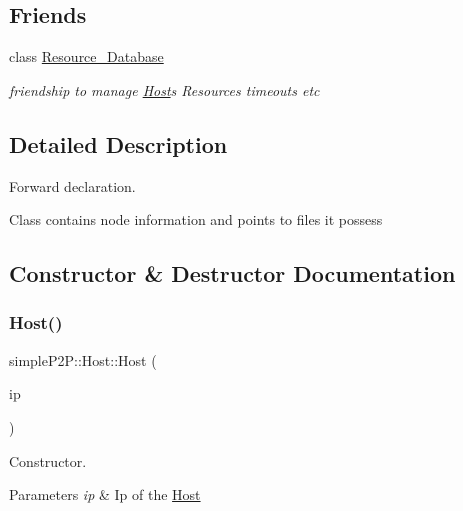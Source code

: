\subsection*{Friends}
\begin{DoxyCompactItemize}
\item 
\mbox{\label{classsimpleP2P_1_1Host_a8d5b8c31f7b51293954816c91b76cabd}} 
class \hyperlink{classsimpleP2P_1_1Host_a8d5b8c31f7b51293954816c91b76cabd}{Resource\+\_\+\+Database}
\begin{DoxyCompactList}\small\item\em friendship to manage \hyperlink{classsimpleP2P_1_1Host}{Host}\textquotesingle{}s Resources timeouts etc \end{DoxyCompactList}\end{DoxyCompactItemize}


\subsection{Detailed Description}
Forward declaration. 

Class contains node information and points to files it possess 

\subsection{Constructor \& Destructor Documentation}
\mbox{\label{classsimpleP2P_1_1Host_abbe0b5c51195b8cf2019d791ace5a5c7}} 
\subsubsection{\texorpdfstring{Host()}{Host()}}
{\footnotesize\ttfamily simple\+P2\+P\+::\+Host\+::\+Host (\begin{DoxyParamCaption}\item[{boost\+::asio\+::ip\+::address}]{ip }\end{DoxyParamCaption})}



Constructor. 


\begin{DoxyParams}{Parameters}
{\em ip} & Ip of the \hyperlink{classsimpleP2P_1_1Host}{Host} \\
\hline
\end{DoxyParams}


